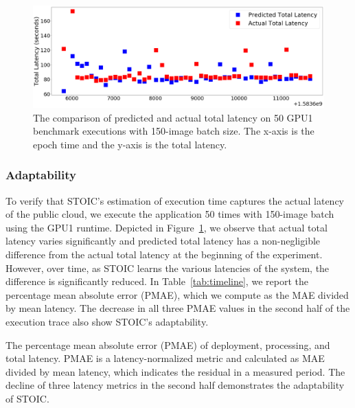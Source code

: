  
 \begin{figure}
    \centering
    \includegraphics[scale=0.20]{figures/timeline.png}
    \caption{The comparison of predicted and actual total latency on 50 GPU1 benchmark executions with 150-image batch size. The x-axis is the epoch time and the y-axis is the total latency. \label{fig:timeline}}
\end{figure}
 
 \subsubsection{Adaptability}
 
To verify that STOIC's estimation of execution time captures the actual latency of the public cloud, we execute the application 50 times with 150-image batch using the GPU1 runtime. Depicted in Figure~\ref{fig:timeline}, we observe that actual total latency varies significantly and predicted total latency has a non-negligible difference from the actual total latency at the beginning of the experiment. However, over time, as STOIC learns the various latencies of the system, the difference is significantly reduced. In Table~\ref{tab:timeline}, we report the percentage mean absolute error (PMAE), which we compute as the MAE divided by mean latency. The decrease in all three PMAE values in the second half of the execution trace also show STOIC's adaptability.

\begin{table}
\centering
\resizebox{340pt}{!}{

}
\caption{The percentage mean absolute error (PMAE) of deployment, processing, and total latency. PMAE is a latency-normalized metric and calculated as MAE divided by mean latency, which indicates the residual in a measured period. The decline of three latency metrics in the second half demonstrates the adaptability of STOIC.
\label{tab:timeline}}
\end{table}

